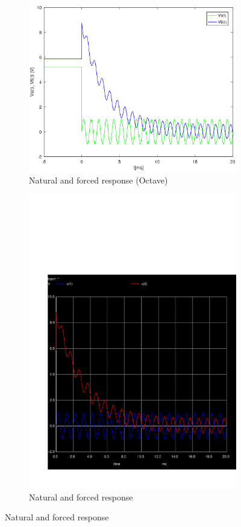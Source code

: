 \begin{figure}[H] 
\centering
\begin{subfigure}{0.4\textwidth}
\includegraphics[width=\textwidth]{Solution.eps}
\caption{Natural and forced response (Octave)}
\label{fig:first}
\end{subfigure}
\begin{subfigure}{0.3\textwidth}
\includegraphics[width=\textwidth]{sim4.pdf}
\caption{Natural and forced response}
\label{fig:second}
\end{subfigure}
\end{figure}

